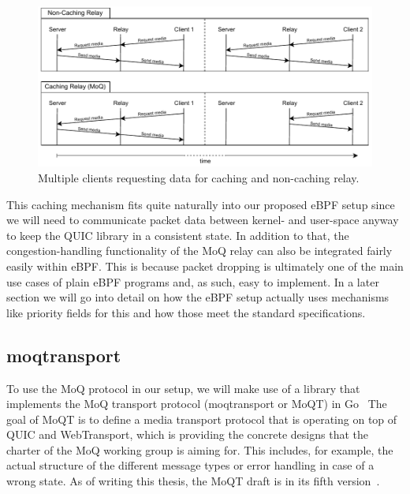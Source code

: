 \vspace{0.5cm}
\begin{figure}[H]
    \centering
    \includegraphics[width=1\linewidth]{figures/02_background/relay-caching.drawio.pdf}
    \caption[Cache related relay traffic]{Multiple clients requesting data for caching and non-caching relay.}\label{fig:relay-caching}
\end{figure}

This caching mechanism fits quite naturally into our proposed eBPF setup since we will need to 
communicate packet data between kernel- and user-space anyway to keep the QUIC library in a 
consistent state.
In addition to that, the congestion-handling functionality of the MoQ relay can also
be integrated fairly easily within eBPF\@.
This is because packet dropping is ultimately one of the main use cases of plain eBPF 
programs and, as such, easy to implement.
In a later section we will go into detail on how the eBPF setup actually uses mechanisms like 
priority fields for this and how those meet the standard specifications.

\subsection{moqtransport}
To use the MoQ protocol in our setup, we will make use of a library that implements 
the MoQ transport protocol (moqtransport or MoQT) in Go~\parencite{priority-moqtransport-repo}
The goal of MoQT is to define a media transport protocol that is operating on top
of QUIC and WebTransport, which is providing the concrete designs that the charter of 
the MoQ working group is aiming for.
This includes, for example, the actual structure of the different message types or error handling in case 
of a wrong state.
As of writing this thesis, the MoQT draft is in its fifth version~\parencite{draft-moqtransport}.

